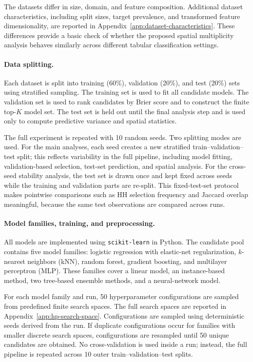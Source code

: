 The datasets differ in size, domain, and feature composition. Additional dataset
characteristics, including split sizes, target prevalence, and transformed feature
dimensionality, are reported in Appendix~\ref{app:dataset-characteristics}.
These differences provide a basic check of whether the proposed spatial multiplicity
analysis behaves similarly across different tabular classification settings.

\paragraph{Data splitting.}
\label{sec:exp-splits}
Each dataset is split into training (60\%), validation (20\%), and test (20\%) sets using
stratified sampling. The training set is used to fit all candidate models. The validation
set is used to rank candidates by Brier score and to construct the finite top-$K$ model
set. The test set is held out until the final analysis step and is used only to compute
predictive variance and spatial statistics.

The full experiment is repeated with 10 random seeds. Two splitting modes are used.
For the main analyses, each seed creates a new stratified train--validation--test split;
this reflects variability in the full pipeline, including model fitting, validation-based
selection, test-set prediction, and spatial analysis. For the cross-seed stability analysis,
the test set is drawn once and kept fixed across seeds while the training and validation
parts are re-split. This fixed-test-set protocol makes pointwise comparisons such as HH
selection frequency and Jaccard overlap meaningful, because the same test observations are
compared across runs.

\paragraph{Model families, training, and preprocessing.}
All models are implemented  using \texttt{scikit-learn}
\citep{pedregosa2011scikit} in Python. The candidate pool contains five model families: logistic
regression with elastic-net regularization, $k$-nearest neighbors (kNN), random forest,
gradient boosting, and multilayer perceptron (MLP). These families cover a linear model,
an instance-based method, two tree-based ensemble methods, and a neural-network model.

For each model family and run, 50 hyperparameter configurations are sampled from
predefined finite search spaces. The full search spaces are reported in
Appendix~\ref{app:hp-search-space}. Configurations are sampled using deterministic seeds
derived from the run. If duplicate configurations occur for families with smaller discrete
search spaces, configurations are resampled until 50 unique candidates are obtained. No
cross-validation is used inside a run; instead, the full pipeline is repeated across 10 outer
train--validation--test splits.

